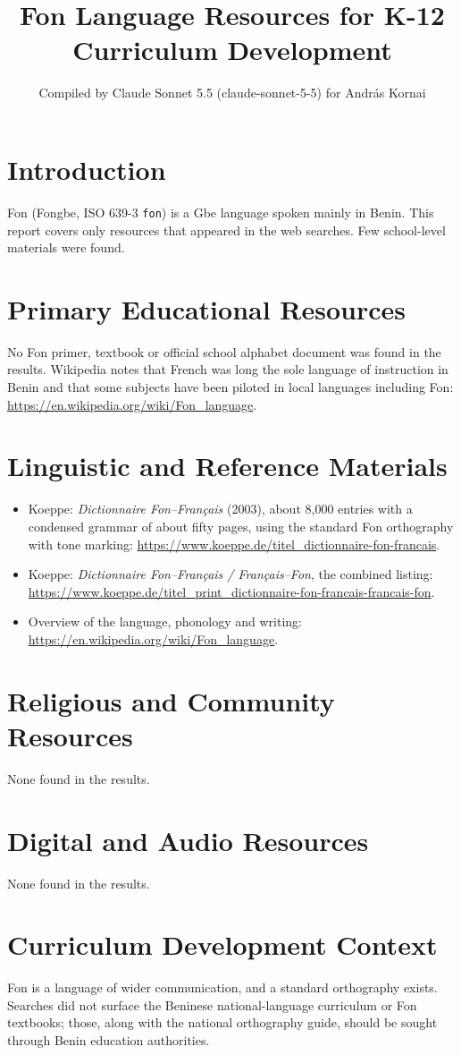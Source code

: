 \documentclass[12pt]{article}
\title{Fon Language Resources for K-12 Curriculum Development}
\author{Compiled by Claude Sonnet 5.5 (claude-sonnet-5-5) for Andr\'as Kornai}
\date{}
\begin{document}
\maketitle

\section{Introduction}
Fon (Fongbe, ISO 639-3 \texttt{fon}) is a Gbe language spoken mainly in Benin. This report covers only resources that appeared in the web searches. Few school-level materials were found.

\section{Primary Educational Resources}
No Fon primer, textbook or official school alphabet document was found in the results. Wikipedia notes that French was long the sole language of instruction in Benin and that some subjects have been piloted in local languages including Fon: \url{https://en.wikipedia.org/wiki/Fon_language}.

\section{Linguistic and Reference Materials}
\begin{itemize}
\item Koeppe: \emph{Dictionnaire Fon--Fran\c{c}ais} (2003), about 8,000 entries with a condensed grammar of about fifty pages, using the standard Fon orthography with tone marking: \url{https://www.koeppe.de/titel_dictionnaire-fon-francais}.
\item Koeppe: \emph{Dictionnaire Fon--Fran\c{c}ais / Fran\c{c}ais--Fon}, the combined listing: \url{https://www.koeppe.de/titel_print_dictionnaire-fon-francais-francais-fon}.
\item Overview of the language, phonology and writing: \url{https://en.wikipedia.org/wiki/Fon_language}.
\end{itemize}

\section{Religious and Community Resources}
None found in the results.

\section{Digital and Audio Resources}
None found in the results.

\section{Curriculum Development Context}
Fon is a language of wider communication, and a standard orthography exists. Searches did not surface the Beninese national-language curriculum or Fon textbooks; those, along with the national orthography guide, should be sought through Benin education authorities.
\end{document}
